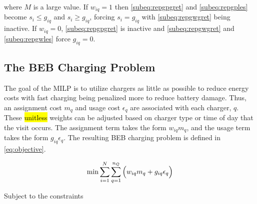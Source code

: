 \documentclass[utf8]{FrontiersinHarvard}
\begin{document}
\noindent
where \(M\) is a large value. If \(w_{iq} = 1\) then \autoref{subeq:repgpgret} and \autoref{subeq:repgples} become \(s_i \leq
g_{iq}\) and \(s_i \geq g_{iq}\), forcing \(s_i = g_{iq}\) with \autoref{subeq:repgwgret} being inactive. If \(w_{iq} = 0\),
\autoref{subeq:repgpgret} is inactive and \autoref{subeq:repgwgret} and \autoref{subeq:repgwles} force \(g_{iq} = 0\).

\subsection{The BEB Charging Problem}
\label{sec:BEB_MILP}
The goal of the MILP is to utilize chargers as little as possible to reduce energy costs with fast charging being
penalized more to reduce battery damage. Thus, an assignment cost \(m_q\) and usage cost \(\epsilon_q\) are associated with each
charger, \(q\). These \hl{unitless} weights can be adjusted based on charger type or time of day that the visit
occurs. The assignment term takes the form \(w_{iq}m_q\), and the usage term takes the form \(g_{iq} \epsilon_q\). The resulting
BEB charging problem is defined in \autoref{eq:objective}.

\begin{equation}
\label{eq:objective}
	\min \sum_{i=1}^N \sum_{q=1}^{n_Q} \Big( w_{iq} m_q + g_{iq} \epsilon_q \Big) \\
\end{equation}

Subject to the constraints
\end{document}
